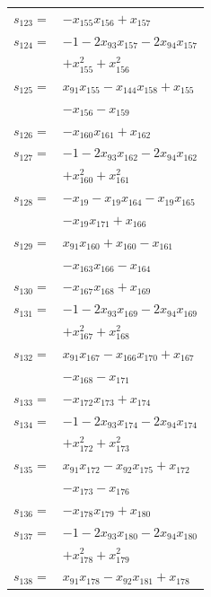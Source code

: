\begin{longtable}{@{}r@{\;}l@{}}
\(s_{123}=\) & \(\displaystyle -x_{155}x_{156} +x_{157}\) \\[3pt]
\(s_{124}=\) & \(\displaystyle -1 -2x_{93}x_{157} -2x_{94}x_{157}\) \\
 & \(\displaystyle +x_{155}^{2} +x_{156}^{2}\) \\[3pt]
\(s_{125}=\) & \(\displaystyle x_{91}x_{155} -x_{144}x_{158} +x_{155}\) \\
 & \(\displaystyle -x_{156} -x_{159}\) \\[3pt]
\(s_{126}=\) & \(\displaystyle -x_{160}x_{161} +x_{162}\) \\[3pt]
\(s_{127}=\) & \(\displaystyle -1 -2x_{93}x_{162} -2x_{94}x_{162}\) \\
 & \(\displaystyle +x_{160}^{2} +x_{161}^{2}\) \\[3pt]
\(s_{128}=\) & \(\displaystyle -x_{19} -x_{19}x_{164} -x_{19}x_{165}\) \\
 & \(\displaystyle -x_{19}x_{171} +x_{166}\) \\[3pt]
\(s_{129}=\) & \(\displaystyle x_{91}x_{160} +x_{160} -x_{161}\) \\
 & \(\displaystyle -x_{163}x_{166} -x_{164}\) \\[3pt]
\(s_{130}=\) & \(\displaystyle -x_{167}x_{168} +x_{169}\) \\[3pt]
\(s_{131}=\) & \(\displaystyle -1 -2x_{93}x_{169} -2x_{94}x_{169}\) \\
 & \(\displaystyle +x_{167}^{2} +x_{168}^{2}\) \\[3pt]
\(s_{132}=\) & \(\displaystyle x_{91}x_{167} -x_{166}x_{170} +x_{167}\) \\
 & \(\displaystyle -x_{168} -x_{171}\) \\[3pt]
\(s_{133}=\) & \(\displaystyle -x_{172}x_{173} +x_{174}\) \\[3pt]
\(s_{134}=\) & \(\displaystyle -1 -2x_{93}x_{174} -2x_{94}x_{174}\) \\
 & \(\displaystyle +x_{172}^{2} +x_{173}^{2}\) \\[3pt]
\(s_{135}=\) & \(\displaystyle x_{91}x_{172} -x_{92}x_{175} +x_{172}\) \\
 & \(\displaystyle -x_{173} -x_{176}\) \\[3pt]
\(s_{136}=\) & \(\displaystyle -x_{178}x_{179} +x_{180}\) \\[3pt]
\(s_{137}=\) & \(\displaystyle -1 -2x_{93}x_{180} -2x_{94}x_{180}\) \\
 & \(\displaystyle +x_{178}^{2} +x_{179}^{2}\) \\[3pt]
\(s_{138}=\) & \(\displaystyle x_{91}x_{178} -x_{92}x_{181} +x_{178}\) \\

\end{longtable}
